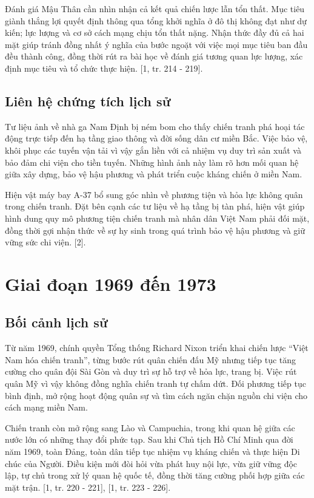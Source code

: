 Đánh giá Mậu Thân cần nhìn nhận cả kết quả chiến lược lẫn tổn thất. Mục tiêu giành thắng lợi quyết định thông qua tổng khởi nghĩa ở đô thị không đạt như dự kiến; lực lượng và cơ sở cách mạng chịu tổn thất nặng. Nhận thức đầy đủ cả hai mặt giúp tránh đồng nhất ý nghĩa của bước ngoặt với việc mọi mục tiêu ban đầu đều thành công, đồng thời rút ra bài học về đánh giá tương quan lực lượng, xác định mục tiêu và tổ chức thực hiện. [1, tr. 214 - 219].

\subsection{Liên hệ chứng tích lịch sử}

Tư liệu ảnh về nhà ga Nam Định bị ném bom cho thấy chiến tranh phá hoại tác động trực tiếp đến hạ tầng giao thông và đời sống dân cư miền Bắc. Việc bảo vệ, khôi phục các tuyến vận tải vì vậy gắn liền với cả nhiệm vụ duy trì sản xuất và bảo đảm chi viện cho tiền tuyến. Những hình ảnh này làm rõ hơn mối quan hệ giữa xây dựng, bảo vệ hậu phương và phát triển cuộc kháng chiến ở miền Nam.

Hiện vật máy bay A-37 bổ sung góc nhìn về phương tiện và hỏa lực không quân trong chiến tranh. Đặt bên cạnh các tư liệu về hạ tầng bị tàn phá, hiện vật giúp hình dung quy mô phương tiện chiến tranh mà nhân dân Việt Nam phải đối mặt, đồng thời gợi nhận thức về sự hy sinh trong quá trình bảo vệ hậu phương và giữ vững sức chi viện. [2].

\section{Giai đoạn 1969 đến 1973}

\subsection{Bối cảnh lịch sử}

Từ năm 1969, chính quyền Tổng thống Richard Nixon triển khai chiến lược “Việt Nam hóa chiến tranh”, từng bước rút quân chiến đấu Mỹ nhưng tiếp tục tăng cường cho quân đội Sài Gòn và duy trì sự hỗ trợ về hỏa lực, trang bị. Việc rút quân Mỹ vì vậy không đồng nghĩa chiến tranh tự chấm dứt. Đối phương tiếp tục bình định, mở rộng hoạt động quân sự và tìm cách ngăn chặn nguồn chi viện cho cách mạng miền Nam.

Chiến tranh còn mở rộng sang Lào và Campuchia, trong khi quan hệ giữa các nước lớn có những thay đổi phức tạp. Sau khi Chủ tịch Hồ Chí Minh qua đời năm 1969, toàn Đảng, toàn dân tiếp tục nhiệm vụ kháng chiến và thực hiện Di chúc của Người. Điều kiện mới đòi hỏi vừa phát huy nội lực, vừa giữ vững độc lập, tự chủ trong xử lý quan hệ quốc tế, đồng thời tăng cường phối hợp giữa các mặt trận. [1, tr. 220 - 221], [1, tr. 223 - 226].

